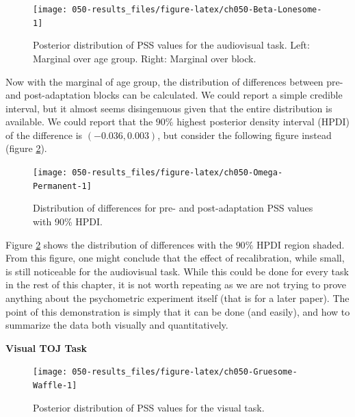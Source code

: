 \documentclass[11pt, oneside, openany]{scrbook}
\begin{document}
\begin{figure}

{\centering \texttt{[image: 050-results\_files/figure-latex/ch050-Beta-Lonesome-1]} 

}

\caption{Posterior distribution of PSS values for the audiovisual task. Left: Marginal over age group. Right: Marginal over block.}\label{fig:ch050-Beta-Lonesome}
\end{figure}

Now with the marginal of age group, the distribution of differences between pre- and post-adaptation blocks can be calculated. We could report a simple credible interval, but it almost seems disingenuous given that the entire distribution is available. We could report that the \(90\%\) highest posterior density interval (HPDI) of the difference is \((-0.036, 0.003)\), but consider the following figure instead (figure \ref{fig:ch050-Omega-Permanent}).

\begin{figure}

{\centering \texttt{[image: 050-results\_files/figure-latex/ch050-Omega-Permanent-1]} 

}

\caption{Distribution of differences for pre- and post-adaptation PSS values with 90\% HPDI.}\label{fig:ch050-Omega-Permanent}
\end{figure}

Figure \ref{fig:ch050-Omega-Permanent} shows the distribution of differences with the \(90\%\) HPDI region shaded. From this figure, one might conclude that the effect of recalibration, while small, is still noticeable for the audiovisual task. While this could be done for every task in the rest of this chapter, it is not worth repeating as we are not trying to prove anything about the psychometric experiment itself (that is for a later paper). The point of this demonstration is simply that it can be done (and easily), and how to summarize the data both visually and quantitatively.

\textbf{Visual TOJ Task}

\begin{figure}

{\centering \texttt{[image: 050-results\_files/figure-latex/ch050-Gruesome-Waffle-1]} 

}

\caption{Posterior distribution of PSS values for the visual task.}\label{fig:ch050-Gruesome-Waffle}
\end{figure}
\end{document}
